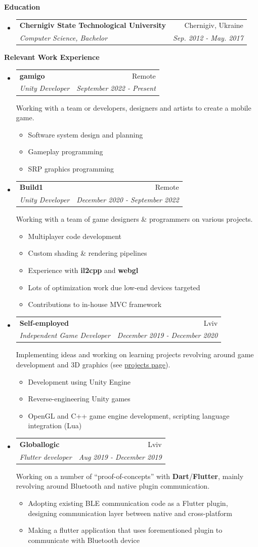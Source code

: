\documentclass[letterpaper,11pt]{article}
\makeatletter
\newcommand{\resitem}[1]{\item #1 \vspace{-2pt}}
\newcommand{\resheading}[1]{{\vspace{.2in} \large \colorbox{title_bg}{\begin{minipage}{\textwidth}{\textbf{#1 \vphantom{p\^{E}}}}\end{minipage}}}}
\newcommand{\ressubheading}[4]{
\begin{tabular*}{7.1in}{l@{\extracolsep{\fill}}r}
		\textbf{#1} & #2 \\
		\textit{#3} & \textit{#4} \\
\end{tabular*}\vspace{0pt}}
\makeatother
\begin{document}
\resheading{Education}
\begin{itemize}
\item
	\ressubheading{Chernigiv State Technological University}{Chernigiv, Ukraine}{Computer Science, Bachelor}{Sep. 2012 - May. 2017}
\end{itemize}

\resheading{Relevant Work Experience}
\begin{itemize}
	\item
		\ressubheading{gamigo}{Remote}{Unity Developer}{September 2022 - Present}

		Working with a team or developers, designers and artists to create a mobile game.
		\begin{itemize}
				\resitem{Software system design and planning}
				\resitem{Gameplay programming}
				\resitem{SRP graphics programming}
		\end{itemize}

	\item
		\ressubheading{Build1}{Remote}{Unity Developer}{December 2020 - September 2022}

		Working with a team of game designers \& programmers on various projects.
		\begin{itemize}
				\resitem{Multiplayer code development}
				\resitem{Custom shading \& rendering pipelines}
				\resitem{Experience with \textbf{il2cpp} and \textbf{webgl}}
				\resitem{Lots of optimization work due low-end devices targeted}
				\resitem{Contributions to in-house MVC framework}
		\end{itemize}

	\item
		\ressubheading{Self-employed}{Lviv}{Independent Game Developer}{December 2019 - December 2020}

		Implementing ideas and working on learning projects revolving around game development and 3D graphics (see \href{https://shdwp.github.io/about/projects/}{\textcolor{link_fg}{\underline{projects page}}}). \\
		\begin{itemize}
				\resitem{Development using Unity Engine}
				\resitem{Reverse-engineering Unity games}
				\resitem{OpenGL and C++ game engine development, scripting language integration (Lua)}
		\end{itemize}

	\item
		\ressubheading{Globallogic}{Lviv}{Flutter developer}{Aug 2019 - December 2019}
		
		Working on a number of ``proof-of-concepts'' with \textbf{Dart}/\textbf{Flutter}, mainly revolving around Bluetooth and native plugin communication.
		\begin{itemize}
				\resitem{Adopting existing BLE communication code as a Flutter plugin, designing communication layer between native and cross-platform}
				\resitem{Making a flutter application that uses forementioned plugin to communicate with Bluetooth device}
		\end{itemize}


\end{itemize}
\end{document}
